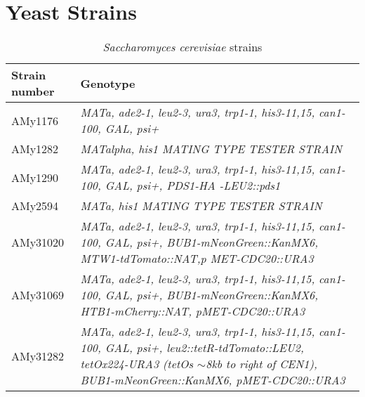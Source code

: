 \chapter{Yeast Strains}
\label{append:yeaststrain}

\begin{table}[htb]
\centering
\renewcommand{\arraystretch}{1.5}
\caption{\textit{Saccharomyces cerevisiae} strains}
\label{tab:cerevisiaetable}
\begin{tabular}{p{}p{}}
\hline
\textbf{Strain number} & \textbf{Genotype}
\\
\hline
AMy1176       & \textit{MATa, ade2-1, leu2-3, ura3, trp1-1, his3-11,15, can1-100, GAL,   psi+}                                                                                                                                                       \\
AMy1282       & \textit{MATalpha, his1 MATING TYPE   TESTER STRAIN}                                                                                                                                                                                  \\
AMy1290       & \textit{MATa, ade2-1, leu2-3, ura3, trp1-1, his3-11,15, can1-100, GAL,   psi+, PDS1-HA -LEU2::pds1}                                                                                                                                  \\
AMy2594       & \textit{MATa, his1 MATING TYPE TESTER   STRAIN}                                                                                                                                                                                      \\
AMy31020      & \textit{MATa, ade2-1, leu2-3, ura3, trp1-1, his3-11,15, can1-100, GAL,   psi+, BUB1-mNeonGreen::KanMX6, MTW1-tdTomato::NAT,p MET-CDC20::URA3}                                                                                        \\
AMy31069      & \textit{MATa, ade2-1, leu2-3, ura3,   trp1-1, his3-11,15, can1-100, GAL, psi+, BUB1-mNeonGreen::KanMX6,   HTB1-mCherry::NAT, pMET-CDC20::URA3}                                                                                       \\
AMy31282      & \textit{MATa, ade2-1, leu2-3, ura3, trp1-1, his3-11,15, can1-100, GAL,   psi+, leu2::tetR-tdTomato::LEU2, tetOx224-URA3 (tetOs $\sim$8kb to right of CEN1),   BUB1-mNeonGreen::KanMX6, pMET-CDC20::URA3}                             \\

\end{tabular}
\end{table}
